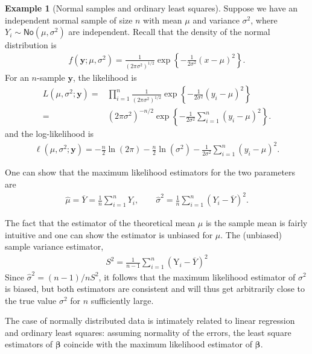 \documentclass[
  11pt,
  letterpaper,
]{book}
\theoremstyle{definition}
\theoremstyle{definition}
\newtheorem{example}{Example}[chapter]
\theoremstyle{definition}
\theoremstyle{remark}
\begin{document}
\begin{example}[Normal samples and ordinary least squares]
\protect\hypertarget{exm:normal}{}{\label{exm:normal} {} }Suppose we have an independent normal sample of size \(n\) with mean \(\mu\) and variance \(\sigma^2\), where
\(Y_i \sim \mathsf{No}(\mu, \sigma^2)\) are independent.
Recall that the density of the normal distribution is
\begin{align*}
f(\boldsymbol{y}; \mu, \sigma^2)=\frac{1}{(2\pi \sigma^2)^{1/2}}\exp\left\{-\frac{1}{2\sigma^2}(x-\mu)^2\right\}.
\end{align*}
For an \(n\)-sample \(\boldsymbol{y}\), the likelihood is
\begin{align*}
L(\mu, \sigma^2; \boldsymbol{y})=&\prod_{i=1}^n\frac{1}{({2\pi \sigma^2})^{1/2}}\exp\left\{-\frac{1}{2\sigma^2}(y_i-\mu)^2\right\}\\
=&(2\pi \sigma^2)^{-n/2}\exp\left\{-\frac{1}{2\sigma^2}\sum_{i=1}^n(y_i-\mu)^2\right\}.
\end{align*}
and the log-likelihood is
\begin{align*}
\ell(\mu, \sigma^2; \boldsymbol{y})=-\frac{n}{2}\ln(2\pi) -\frac{n}{2}\ln(\sigma^2)-\frac{1}{2\sigma^2}\sum_{i=1}^n (y_i-\mu)^2.
\end{align*}

One can show that the maximum likelihood estimators for the two parameters are
\begin{align*}
\widehat{\mu}=\overline{Y}=\frac{1}{n} \sum_{i=1}^n Y_i, \qquad \widehat{\sigma}^2=\frac{1}{n}\sum_{i=1}^n (Y_i-\overline{Y})^2.
\end{align*}

The fact that the estimator of the theoretical mean \(\mu\) is the sample mean is fairly intuitive and one can show the estimator is unbiased for \(\mu\). The (unbiased) sample variance estimator,
\begin{align*}
S^2=\frac{1}{n-1} \sum_{i=1}^n (\mathrm{Y}_i-\overline{Y})^2
\end{align*}
Since \(\widehat{\sigma}^2=(n-1)/n S^2\), it follows that the maximum likelihood estimator of \(\sigma^2\) is biased, but both estimators are consistent and will thus get arbitrarily close to the true value \(\sigma^2\) for \(n\) sufficiently large.

The case of normally distributed data is intimately related to linear regression and ordinary least squares: assuming normality of the errors, the least square estimators of \(\boldsymbol{\beta}\) coincide with the maximum likelihood estimator of \(\boldsymbol{\beta}\).


\end{example}
\end{document}
